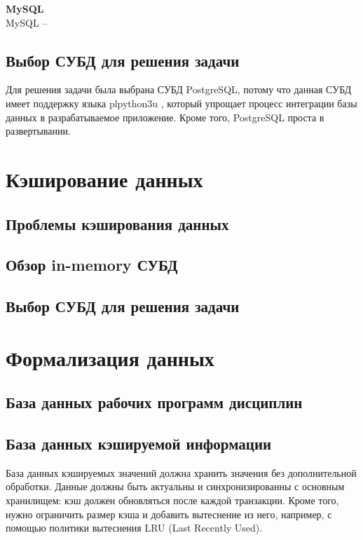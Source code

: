 \textbf{MySQL}\\

MySQL \cite{mysql} --

\subsection{Выбор СУБД для решения задачи}

Для решения задачи была выбрана СУБД PostgreSQL, потому что данная СУБД имеет поддержку языка plpython3u \cite{plpython3u}, который упрощает процесс интеграции базы данных в разрабатываемое приложение. Кроме того, PostgreSQL проста в развертывании.

\section{Кэширование данных}

\subsection{Проблемы кэширования данных}

\subsection{Обзор in-memory СУБД}

\subsection{Выбор СУБД для решения задачи}

\section{Формализация данных}

\subsection{База данных рабочих программ дисциплин}

\subsection{База данных кэшируемой информации}

База данных кэшируемых значений должна хранить значения без дополнительной обработки. Данные должны быть актуальны и синхронизированны с основным хранилищем: кэш должен обновляться после каждой транзакции. Кроме того, нужно ограничить размер кэша и добавить вытеснение из него, например, с помощью политики вытеснения LRU \cite{lru} (Last Recently Used).

